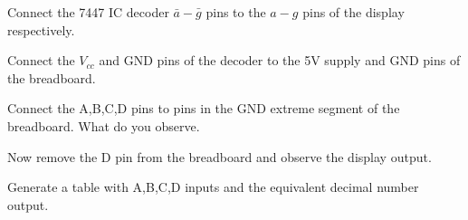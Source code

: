 

%
\begin{problem}
	Connect the 7447 IC decoder $\bar{a}-\bar{g}$ pins to the $a-g$ pins of the display respectively.
\end{problem}
\begin{problem}
	Connect the $V_{cc}$ and GND pins of the decoder to the 5V supply and GND pins of the breadboard.
\end{problem}
\begin{problem}
	Connect the A,B,C,D pins to pins in the GND extreme segment of the breadboard.  What do you observe.
\end{problem}
\begin{problem}
	Now remove the D pin from the breadboard and observe the display output.
\end{problem}
\begin{problem}
	Generate a table with A,B,C,D inputs and the equivalent decimal number output.
\end{problem}
